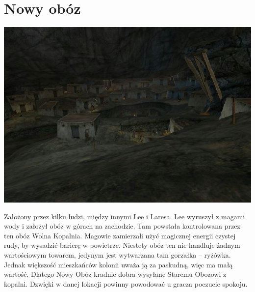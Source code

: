 \documentclass[11pt,polish, openany]{book}
\begin{document}
\section{Nowy obóz}
\begin{center}
 \includegraphics[scale=0.5]{nowyoboz.jpg}
\end{center}
Założony przez kilku ludzi, między innymi Lee i Laresa. Lee wyruszył z magami wody i założył obóz w górach na zachodzie. Tam powstała kontrolowana przez ten obóz Wolna Kopalnia. Magowie zamierzali użyć magicznej energii czystej rudy, by wysadzić barierę w powietrze. Niestety obóz ten nie handluje żadnym wartościowym towarem, jedynym jest wytwarzana tam gorzałka – ryżówka. Jednak większość mieszkańców kolonii uważa ją za paskudną, więc ma małą wartość. Dlatego Nowy Obóz kradnie dobra wysyłane Staremu Obozowi z kopalni.
Dzwięki w danej lokacji powinny powodować u gracza poczucie spokoju.
\end{document}
